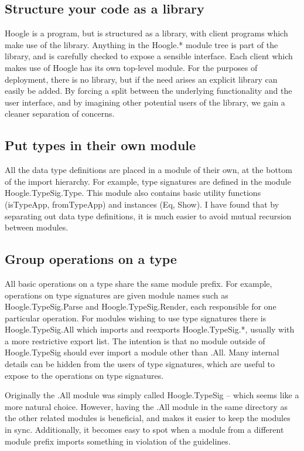 \documentclass{tmr}
\newcommand{\code}[1]{\textsf{#1}}
\begin{document}
\subsection{Structure your code as a library}

Hoogle is a program, but is structured as a library, with client programs which make use of the library. Anything in the \code{Hoogle.*} module tree is part of the library, and is carefully checked to expose a sensible interface. Each client which makes use of Hoogle has its own top-level module. For the purposes of deployment, there is no library, but if the need arises an explicit library can easily be added. By forcing a split between the underlying functionality and the user interface, and by imagining other potential users of the library, we gain a cleaner separation of concerns.

\subsection{Put types in their own module}

All the data type definitions are placed in a module of their own, at the bottom of the import hierarchy. For example, type signatures are defined in the module \code{Hoogle.TypeSig.Type}. This module also contains basic utility functions (\code{isTypeApp}, \code{fromTypeApp}) and instances (\code{Eq}, \code{Show}). I have found that by separating out data type definitions, it is much easier to avoid mutual recursion between modules.

\subsection{Group operations on a type}

All basic operations on a type share the same module prefix. For example, operations on type signatures are given module names such as \code{Hoogle.TypeSig.Parse} and \code{Hoogle.TypeSig.Render}, each responsible for one particular operation. For modules wishing to use type signatures there is \code{Hoogle.TypeSig.All} which imports and reexports \code{Hoogle.TypeSig.*}, usually with a more restrictive export list. The intention is that no module outside of \code{Hoogle.TypeSig} should ever import a module other than \code{.All}. Many internal details can be hidden from the users of type signatures, which are useful to expose to the operations on type signatures.

Originally the \code{.All} module was simply called \code{Hoogle.TypeSig} -- which seems like a more natural choice. However, having the \code{.All} module in the same directory as the other related modules is beneficial, and makes it easier to keep the modules in sync. Additionally, it becomes easy to spot when a module from a different module prefix imports something in violation of the guidelines.
\end{document}
